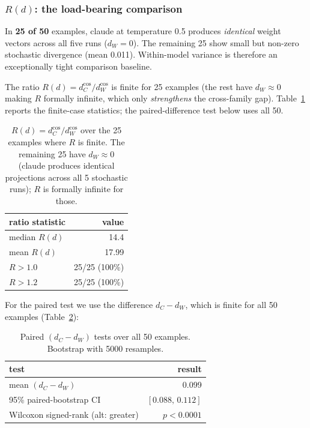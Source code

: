 \subsubsection{$R(d)$: the load-bearing comparison}
\label{sec:results:exp1b:rd}

In \textbf{25 of 50} examples, claude at temperature 0.5 produces \emph{identical} weight vectors across all five runs ($d_W = 0$). The remaining 25 show small but non-zero stochastic divergence (mean 0.011). Within-model variance is therefore an exceptionally tight comparison baseline.

The ratio $R(d) = d_C^{\cos} / d_W^{\cos}$ is finite for 25 examples (the rest have $d_W \approx 0$ making $R$ formally infinite, which only \emph{strengthens} the cross-family gap). Table~\ref{tab:rd} reports the finite-case statistics; the paired-difference test below uses all 50.

\begin{table}[t]
\centering
\caption{$R(d) = d_C^{\cos} / d_W^{\cos}$ over the 25 examples where $R$ is finite. The remaining 25 have $d_W \approx 0$ (claude produces identical projections across all 5 stochastic runs); $R$ is formally infinite for those.}
\label{tab:rd}
\begin{tabular}{lr}
\toprule
\textbf{ratio statistic} & \textbf{value} \\
\midrule
median $R(d)$               & 14.4 \\
mean $R(d)$                 & 17.99 \\
$R > 1.0$                   & 25/25 (100\%) \\
$R > 1.2$                   & 25/25 (100\%) \\
\bottomrule
\end{tabular}
\end{table}

For the paired test we use the difference $d_C - d_W$, which is finite for all 50 examples (Table~\ref{tab:paired}):

\begin{table}[t]
\centering
\caption{Paired $(d_C - d_W)$ tests over all 50 examples. Bootstrap with 5000 resamples.}
\label{tab:paired}
\begin{tabular}{lr}
\toprule
\textbf{test} & \textbf{result} \\
\midrule
mean $(d_C - d_W)$                       & 0.099 \\
95\% paired-bootstrap CI                 & $[0.088,\, 0.112]$ \\
Wilcoxon signed-rank (alt: greater)      & $p < 0.0001$ \\
\bottomrule
\end{tabular}
\end{table}

